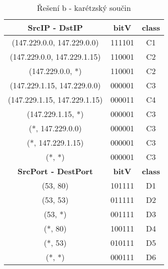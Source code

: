 \documentclass[12pt,a4paper,titlepage,final]{article}
\begin{document}
\begin{enumerate}
\begin{table}[h!]
	\begin{tabular}{| c | c | c |}
		\hline
		\textbf{SrcIP - DstIP} & \textbf{bitV} & \textbf{class} \\ \hline \hline
		(147.229.0.0, 147.229.0.0) & 111101 & C1 \\ \hline
		(147.229.0.0, 147.229.1.15) & 110001 & C2 \\ \hline
		(147.229.0.0, *) & 110001 & C2 \\ \hline
		(147.229.1.15, 147.229.0.0) & 000001 & C3 \\ \hline
		(147.229.1.15, 147.229.1.15) & 000011 & C4 \\ \hline
		(147.229.1.15, *) & 000001 & C3 \\ \hline
		(*, 147.229.0.0) & 000001 & C3 \\ \hline
		(*, 147.229.1.15) & 000001 & C3 \\ \hline
		(*, *) & 000001 & C3 \\ \hline \hline
		\textbf{SrcPort - DestPort} & \textbf{bitV} & \textbf{class} \\ \hline \hline
		(53, 80) & 101111 & D1 \\ \hline
		(53, 53) & 011111 & D2 \\ \hline
		(53, *) & 001111 & D3 \\ \hline
		(*, 80) & 100111 & D4 \\ \hline
		(*, 53) & 010111 & D5 \\ \hline
		(*, *) & 000111 & D6 \\ \hline
	\end{tabular}
	\caption{Řešení b - karétzský součin}
\end{table}




\end{enumerate}
\end{document}
